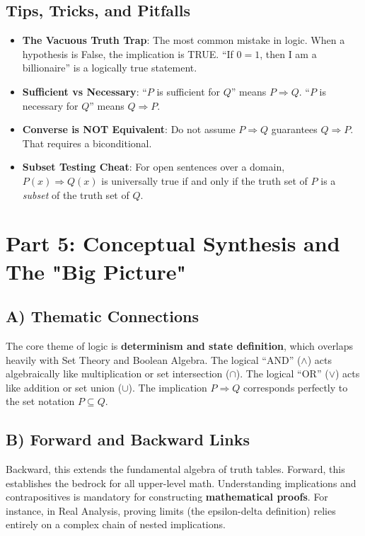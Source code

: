 \documentclass[11pt]{article}
\begin{document}
\subsection{Tips, Tricks, and Pitfalls}
\begin{itemize}
    \item \textbf{The Vacuous Truth Trap}: The most common mistake in logic. When a hypothesis is False, the implication is TRUE. ``If $0=1$, then I am a billionaire'' is a logically true statement.
    \item \textbf{Sufficient vs Necessary}: ``$P$ is sufficient for $Q$'' means $P \Rightarrow Q$. ``$P$ is necessary for $Q$'' means $Q \Rightarrow P$.
    \item \textbf{Converse is NOT Equivalent}: Do not assume $P \Rightarrow Q$ guarantees $Q \Rightarrow P$. That requires a biconditional.
    \item \textbf{Subset Testing Cheat}: For open sentences over a domain, $P(x) \Rightarrow Q(x)$ is universally true if and only if the truth set of $P$ is a \textit{subset} of the truth set of $Q$.
\end{itemize}

\section{Part 5: Conceptual Synthesis and The "Big Picture"}

\subsection{A) Thematic Connections}
The core theme of logic is \textbf{determinism and state definition}, which overlaps heavily with Set Theory and Boolean Algebra. The logical ``AND'' ($\wedge$) acts algebraically like multiplication or set intersection ($\cap$). The logical ``OR'' ($\vee$) acts like addition or set union ($\cup$). The implication $P \Rightarrow Q$ corresponds perfectly to the set notation $P \subseteq Q$.

\subsection{B) Forward and Backward Links}
Backward, this extends the fundamental algebra of truth tables. Forward, this establishes the bedrock for all upper-level math. Understanding implications and contrapositives is mandatory for constructing \textbf{mathematical proofs}. For instance, in Real Analysis, proving limits (the epsilon-delta definition) relies entirely on a complex chain of nested implications.
\end{document}
